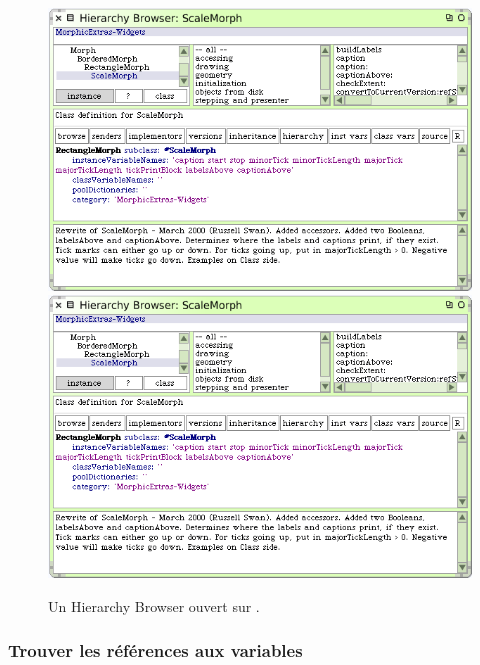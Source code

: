 \documentclass[a4paper,10pt,twoside]{book}
\begin{document}
\begin{figure}[btp]
	\begin{center}
	\ifluluelse
		{\includegraphics[width=\textwidth]{hierarchyBrowser}}
		{\includegraphics[scale=0.7]{hierarchyBrowser}}
	\end{center}
	\caption{Un Hierarchy Browser ouvert sur .}
	\label{fig:hierarchyBrowser}
\end{figure}

\subsubsection{Trouver les r\'ef\'erences aux variables}
\label{sec:variables}
\end{document}
